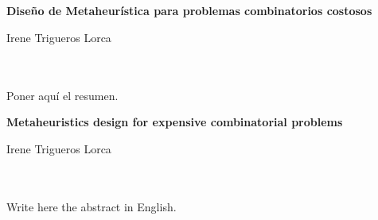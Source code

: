 \chapter*{}






\cleardoublepage
\thispagestyle{empty}

\begin{center}
{\large\bfseries Diseño de Metaheurística para problemas combinatorios costosos}\\
\end{center}
\begin{center}
Irene Trigueros Lorca\\
\end{center}

\\

\vspace{0.7cm}
\\

Poner aquí el resumen.
\cleardoublepage


\thispagestyle{empty}


\begin{center}
{\large\bfseries Metaheuristics design for expensive combinatorial problems }\\
\end{center}
\begin{center}
Irene Trigueros Lorca\\
\end{center}

\\

\vspace{0.7cm}
\\

Write here the abstract in English.

\chapter*{}
\thispagestyle{empty}


